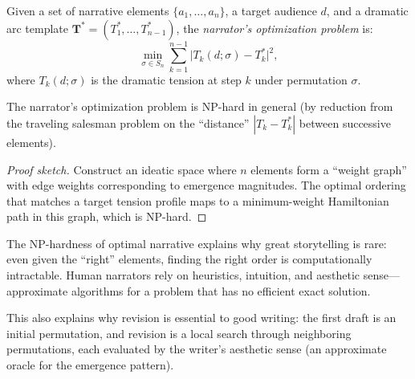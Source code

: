 \begin{definition}
\label{def:optimal-narrative}
Given a set of narrative elements $\{a_1, \ldots, a_n\}$, a target audience
$d$, and a dramatic arc template $\mathbf{T}^* = (T_1^*, \ldots, T_{n-1}^*)$,
the \emph{narrator's optimization problem} is:
\[
  \min_{\sigma \in S_n} \sum_{k=1}^{n-1}
  \bigl|T_k(d; \sigma) - T_k^*\bigr|^2,
\]
where $T_k(d; \sigma)$ is the dramatic tension at step $k$ under
permutation $\sigma$.
\end{definition}

\begin{theorem}
\label{thm:narrative-np-hard}
The narrator's optimization problem is NP-hard in general (by reduction
from the traveling salesman problem on the ``distance'' $|T_k - T_k^*|$
between successive elements).
\end{theorem}

\begin{proof}[Proof sketch]
Construct an ideatic space where $n$ elements form a ``weight graph'' with
edge weights corresponding to emergence magnitudes.  The optimal ordering
that matches a target tension profile maps to a minimum-weight Hamiltonian
path in this graph, which is NP-hard.
\end{proof}

\begin{interpretation}
\label{interp:storytelling-hard}
The NP-hardness of optimal narrative explains why great storytelling is rare:
even given the ``right'' elements, finding the right order is computationally
intractable.  Human narrators rely on heuristics, intuition, and aesthetic
sense---approximate algorithms for a problem that has no efficient exact
solution.

This also explains why revision is essential to good writing: the first
draft is an initial permutation, and revision is a local search through
neighboring permutations, each evaluated by the writer's aesthetic sense
(an approximate oracle for the emergence pattern).
\end{interpretation}

